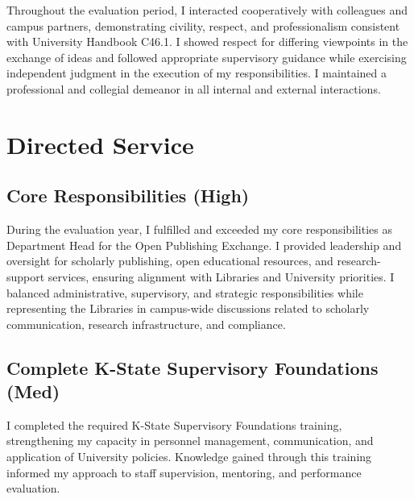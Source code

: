 Throughout the evaluation period, I interacted cooperatively with colleagues and campus partners, demonstrating civility, respect, and professionalism consistent with University Handbook C46.1. I showed respect for differing viewpoints in the exchange of ideas and followed appropriate supervisory guidance while exercising independent judgment in the execution of my responsibilities. I maintained a professional and collegial demeanor in all internal and external interactions.


\section{Directed Service}

\vspace{\baselineskip}

\subsection*{Core Responsibilities (High)}

During the evaluation year, I fulfilled and exceeded my core responsibilities as Department Head for the Open Publishing Exchange. I provided leadership and oversight for scholarly publishing, open educational resources, and research-support services, ensuring alignment with Libraries and University priorities. I balanced administrative, supervisory, and strategic responsibilities while representing the Libraries in campus-wide discussions related to scholarly communication, research infrastructure, and compliance.

\vspace{\baselineskip}

\subsection*{Complete K-State Supervisory Foundations (Med)}

I completed the required K-State Supervisory Foundations training, strengthening my capacity in personnel management, communication, and application of University policies. Knowledge gained through this training informed my approach to staff supervision, mentoring, and performance evaluation.

